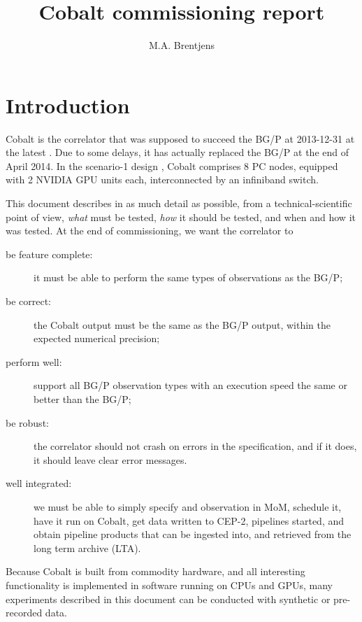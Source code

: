 \documentclass[a4paper,twoside, 10pt]{report}
\title{Cobalt commissioning report}
\author{M.A. Brentjens}
\newcommand{\cobalt}{Cobalt\xspace}
\newcommand{\bgp}{BG/P\xspace}
\newcommand{\cep}{CEP-2\xspace}
\begin{document}
\maketitle

\tableofcontents

\chapter{Introduction}

\cobalt is the correlator that was supposed to succeed the \bgp at
2013-12-31 at the latest \citep{CobaltRequirements2013}. Due to some
delays, it has actually replaced the \bgp at the end of April 2014. In
the scenario-1 design \citep{CobaltHardwareDesign2013}, \cobalt
comprises 8 PC nodes, equipped with 2 NVIDIA GPU units each,
interconnected by an infiniband switch.

This document describes in as much detail as possible, from a
technical-scientific point of view, \emph{what} must be tested,
\emph{how} it should be tested, and when and how it was tested. At the
end of commissioning, we want the correlator to

\begin{description}
\item[be feature complete:] it must be able to perform the same types of
  observations as the \bgp;
\item[be correct:] the \cobalt output must be the same as the \bgp output,
  within the expected numerical precision;
\item[perform well:] support all \bgp observation types with an
  execution speed the same or better than the \bgp;
\item[be robust:] the correlator should not crash on errors in the
  specification, and if it does, it should leave clear error messages.
\item[well integrated:] we must be able to simply specify and
  observation in MoM, schedule it, have it run on \cobalt, get data
  written to \cep, pipelines started, and obtain pipeline products
  that can be ingested into, and retrieved from the long term archive
  (LTA).
\end{description}

Because \cobalt is built from commodity hardware, and all interesting
functionality is implemented in software
\citep{CobaltSoftwareDesign2013} running on CPUs and GPUs, many
experiments described in this document can be conducted with
synthetic or pre-recorded data.
\end{document}
